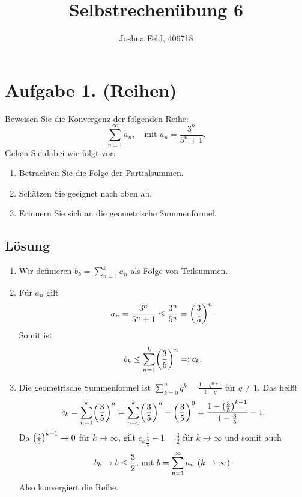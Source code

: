\documentclass[german,12pt]{homework}
\title{Selbstrechenübung 6}
\author{Joshua Feld, 406718}
\institute{RWTH Aachen University\\Center for Computational Engineering Science}
\DeclarePairedDelimiter{\enbrace}{(}{)}
\begin{document}
    \maketitle

    \section*{Aufgabe 1. (Reihen)}

    \begin{problem}
        Beweisen Sie die Konvergenz der folgenden Reihe:
        \[\sum_{n = 1}^\infty{a_n}, \quad \text{mit }a_n = \frac{3^n}{5^n +
        1}.\]
        Gehen Sie dabei wie folgt vor:
        \begin{enumerate}
            \item Betrachten Sie die Folge der Partialsummen.
            \item Schätzen Sie geeignet nach oben ab.
            \item Erinnern Sie sich an die geometrische Summenformel.
        \end{enumerate}
    \end{problem}

    \subsection*{Lösung}
    \begin{enumerate}
        \item Wir definieren \(b_k = \sum_{n = 1}^ka_n\) als Folge von
        Teilsummen.
        \item Für \(a_n\) gilt
        \[a_n = \frac{3^n}{5^n + 1} \le \frac{3^n}{5^n} =
        \enbrace*{\frac{3}{5}}^n.\]
        Somit ist
        \[b_k \le \sum_{n = 1}^k\enbrace*{\frac{3}{5}}^n =: c_k.\]
        \item Die geometrische Summenformel ist \(\sum_{k = 0}^nq^k =
        \frac{1 - q^{n + 1}}{1 - q}\) für \(q \ne 1\). Das heißt
        \[c_k = \sum_{n = 1}^k\enbrace*{\frac{3}{5}}^n =
        \sum_{n = 0}^k\enbrace*{\frac{3}{5}}^n - \enbrace*{\frac{3}{5}}^0 =
        \frac{1 - \enbrace*{\frac{3}{5}}^{k + 1}}{1 - \frac{3}{5}} - 1.\]
        Da \(\enbrace*{\frac{3}{5}}^{k + 1} \to 0\) für \(k \to \infty\), gilt
        \(c_k \frac{1}{\frac{2}{5}} - 1 = \frac{3}{2}\) für \(k \to \infty\) und
        somit auch
        \[b_k \to b \le \frac{3}{2} \text{, mit }b = \sum_{n = 1}^{\infty}a_n\
        \enbrace*{k \to \infty}.\]
        Also konvergiert die Reihe.
    \end{enumerate}
\end{document}
